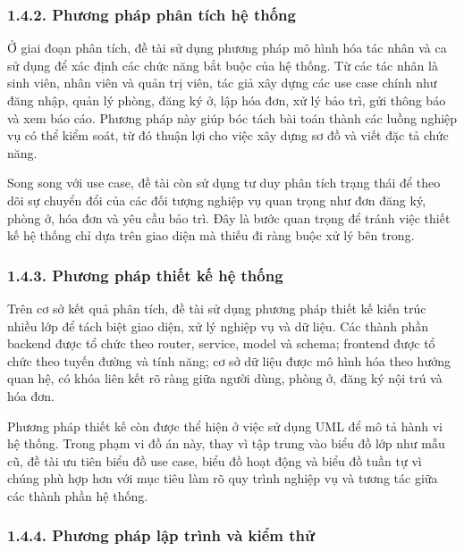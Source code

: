\documentclass[12pt]{article}
\begin{document}
\subsubsection*{1.4.2. Phương pháp phân tích hệ thống}

Ở giai đoạn phân tích, đề tài sử dụng phương pháp mô hình hóa tác nhân và ca sử dụng để xác định các chức năng bắt buộc của hệ thống. Từ các tác nhân là sinh viên, nhân viên và quản trị viên, tác giả xây dựng các use case chính như đăng nhập, quản lý phòng, đăng ký ở, lập hóa đơn, xử lý bảo trì, gửi thông báo và xem báo cáo. Phương pháp này giúp bóc tách bài toán thành các luồng nghiệp vụ có thể kiểm soát, từ đó thuận lợi cho việc xây dựng sơ đồ và viết đặc tả chức năng.

Song song với use case, đề tài còn sử dụng tư duy phân tích trạng thái để theo dõi sự chuyển đổi của các đối tượng nghiệp vụ quan trọng như đơn đăng ký, phòng ở, hóa đơn và yêu cầu bảo trì. Đây là bước quan trọng để tránh việc thiết kế hệ thống chỉ dựa trên giao diện mà thiếu đi ràng buộc xử lý bên trong.

\subsubsection*{1.4.3. Phương pháp thiết kế hệ thống}

Trên cơ sở kết quả phân tích, đề tài sử dụng phương pháp thiết kế kiến trúc nhiều lớp để tách biệt giao diện, xử lý nghiệp vụ và dữ liệu. Các thành phần backend được tổ chức theo router, service, model và schema; frontend được tổ chức theo tuyến đường và tính năng; cơ sở dữ liệu được mô hình hóa theo hướng quan hệ, có khóa liên kết rõ ràng giữa người dùng, phòng ở, đăng ký nội trú và hóa đơn.

Phương pháp thiết kế còn được thể hiện ở việc sử dụng UML để mô tả hành vi hệ thống. Trong phạm vi đồ án này, thay vì tập trung vào biểu đồ lớp như mẫu cũ, đề tài ưu tiên biểu đồ use case, biểu đồ hoạt động và biểu đồ tuần tự vì chúng phù hợp hơn với mục tiêu làm rõ quy trình nghiệp vụ và tương tác giữa các thành phần hệ thống.

\subsubsection*{1.4.4. Phương pháp lập trình và kiểm thử}
\end{document}
